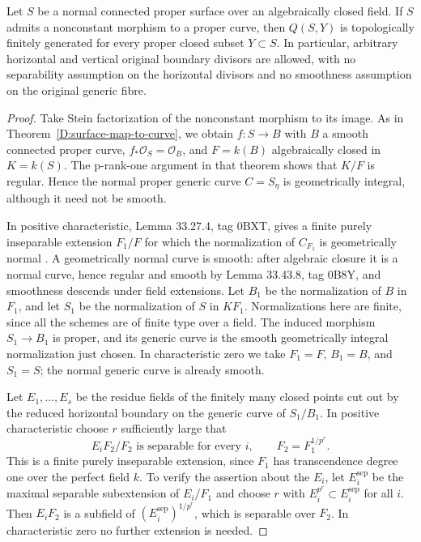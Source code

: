 \begin{theorem}
\label{D:surface-map-all-boundaries}
Let $S$ be a normal connected proper surface over an
algebraically closed field.  If $S$ admits a nonconstant
morphism to a proper curve, then $Q(S,Y)$ is topologically
finitely generated for every proper closed subset $Y\subset S$.
In particular, arbitrary horizontal and vertical original
boundary divisors are allowed, with no separability assumption
on the horizontal divisors and no smoothness assumption on
the original generic fibre.
\end{theorem}
\begin{proof}
Take Stein factorization of the nonconstant morphism to its
image.  As in Theorem~\ref{D:surface-map-to-curve}, we obtain
$f:S\to B$ with $B$ a smooth connected proper curve,
$f_*\mathcal O_S=\mathcal O_B$, and $F=k(B)$ algebraically
closed in $K=k(S)$.  The p-rank-one argument in that theorem
shows that $K/F$ is regular.  Hence the normal proper generic
curve $C=S_\eta$ is geometrically integral, although it need
not be smooth.

In positive characteristic, Lemma 33.27.4, tag 0BXT, gives
a finite purely inseparable extension $F_1/F$ for which the
normalization of $C_{F_1}$ is geometrically normal
\cite{C_StacksLogFibration}.  A geometrically normal curve
is smooth: after algebraic closure it is a normal curve,
hence regular and smooth by Lemma 33.43.8, tag 0B8Y, and
smoothness descends under field extensions.  Let $B_1$ be the
normalization of $B$ in $F_1$, and let $S_1$ be the normalization
of $S$ in $KF_1$.  Normalizations here are finite, since all
the schemes are of finite type over a field.  The induced
morphism $S_1\to B_1$ is proper, and its generic curve is
the smooth geometrically integral normalization just chosen.
In characteristic zero we take $F_1=F$, $B_1=B$, and $S_1=S$;
the normal generic curve is already smooth.

Let $E_1,\ldots,E_s$ be the residue fields of the finitely many
closed points cut out by the reduced horizontal boundary
on the generic curve of $S_1/B_1$.  In positive characteristic
choose $r$ sufficiently large that
\[
        E_iF_2/F_2\text{ is separable for every }i,
        \qquad F_2=F_1^{1/p^r}.
\]
This is a finite purely inseparable extension, since $F_1$
has transcendence degree one over the perfect field $k$.
To verify the assertion about the $E_i$, let $E_i^{\mathrm{sep}}$
be the maximal separable subextension of $E_i/F_1$ and choose
$r$ with $E_i^{p^r}\subset E_i^{\mathrm{sep}}$ for all $i$.
Then $E_iF_2$ is a subfield of
$(E_i^{\mathrm{sep}})^{1/p^r}$, which is separable over $F_2$.
In characteristic zero no further extension is needed.


\end{proof}
